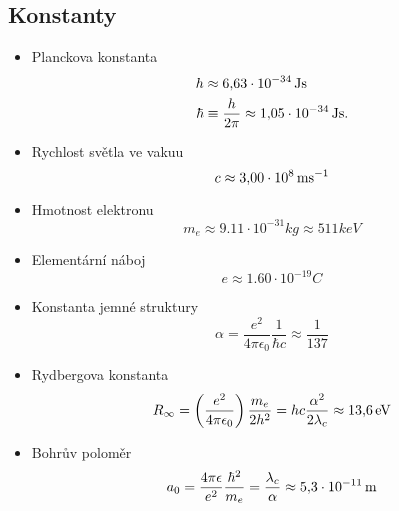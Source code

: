 \subsection{Konstanty}
\begin{itemize}
    \item Planckova konstanta
        \begin{align}
            h&\approx6,\!63\cdot 10^{-34}\,\mathrm{{Js}}\\
            \hbar&\equiv\frac{h}{2\pi}\approx1,\!05\cdot 10^{-34}\,\mathrm{{Js}}.
        \end{align}

    \item Rychlost světla ve vakuu
        \begin{equation}
            c\approx 3,\!00\cdot 10^{8}\,\mathrm{{ms^{-1}}}
        \end{equation}
    
    \item Hmotnost elektronu
        \begin{equation}
            m_{e}\approx 9.11\cdot 10^{-31}\unit{kg}\approx 511\unit{keV}
        \end{equation}

    \item Elementární náboj
        \begin{equation}
            e\approx 1.60\cdot 10^{-19}\unit{C}
        \end{equation}

    \item Konstanta jemné struktury
        \begin{equation}
            \alpha=\frac{e^{2}}{4\pi\epsilon_{0}}\frac{1}{\hbar c}\approx\frac{1}{137}
        \end{equation}

    \item Rydbergova konstanta
        \begin{equation}
            R_{\infty}=\left(\frac{e^{2}}{4\pi\epsilon_{0}}\right)\frac{m_{e}}{2h^{2}}=hc\frac{\alpha^{2}}{2\lambda_{c}}\approx 13,\!6\,\mathrm{{eV}}
        \end{equation}

    \item Bohrův poloměr
        \begin{equation}
            a_{0}=\frac{4\pi\epsilon}{e^{2}}\frac{\hbar^{2}}{m_{e}}=\frac{\lambda_{c}}{\alpha}\approx5,\!3\cdot10^{-11}\,\mathrm{{m}}
        \end{equation}


\end{itemize}
